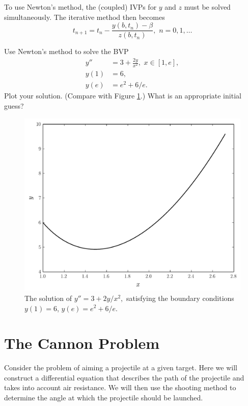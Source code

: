 To use Newton's method, the (coupled) IVPs for $y$ and $z$ must be solved simultaneously.
The iterative method then becomes 
\[t_{n+1} = t_n - \frac{ y(b,t_n) - \beta}{z(b,t_n)}, \,\, n = 0,1,\hdots\]

\begin{problem}
Use Newton's method to solve the BVP
\begin{equation*}
\begin{split}
y'' &= 3 + \frac{2y}{x^2}, \,\, x \in [1,e],\\
y(1) &= 6, \\
y(e) &= e^2 + 6/e.
\end{split}
\end{equation*}
Plot your solution.
(Compare with Figure \ref{prob:shooting2}.)
What is an appropriate initial guess? 

\begin{figure}[H]
\includegraphics[width=\textwidth]{Fig2.pdf}
\caption{The solution of  $y'' = 3 + 2y/x^2,$ satisfying the boundary conditions $y(1) = 6$, $ y(e) =  e^2 + 6/e$.}
\label{prob:shooting2}
\end{figure}
\end{problem}

\section*{The Cannon Problem}

Consider the problem of aiming a projectile at a given target.
Here we will construct a differential equation that describes the path of the projectile and takes into account air resistance.
We will then use the shooting method to determine the angle at which the projectile should be launched. 

